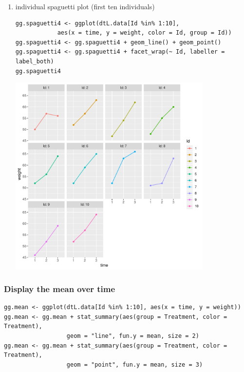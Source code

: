 \documentclass{article}
\begin{document}
\begin{enumerate}
\clearpage

\item individual spaguetti plot (first ten individuals)
\label{sec:org0f44188}

\lstset{language=r,label= ,caption= ,captionpos=b,numbers=none}
\begin{lstlisting}
gg.spaguetti4 <- ggplot(dtL.data[Id %in% 1:10], 
			aes(x = time, y = weight, color = Id, group = Id))
gg.spaguetti4 <- gg.spaguetti4 + geom_line() + geom_point()
gg.spaguetti4 <- gg.spaguetti4 + facet_wrap(~ Id, labeller = label_both) 
gg.spaguetti4
\end{lstlisting}

\begin{center}
\includegraphics[width=0.8\textwidth]{./figures/fig-spaguetti4.pdf}
\end{center}

\clearpage
\end{enumerate}

\subsubsection{Display the mean over time}
\label{sec:org3f14553}

\lstset{language=r,label= ,caption= ,captionpos=b,numbers=none}
\begin{lstlisting}
gg.mean <- ggplot(dtL.data[Id %in% 1:10], aes(x = time, y = weight))
gg.mean <- gg.mean + stat_summary(aes(group = Treatment, color = Treatment), 
				  geom = "line", fun.y = mean, size = 2)
gg.mean <- gg.mean + stat_summary(aes(group = Treatment, color = Treatment), 
				  geom = "point", fun.y = mean, size = 3)
\end{lstlisting}
\end{document}
